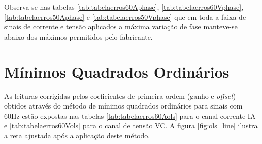 \begin{table}[H]
\end{table}

Observa-se nas tabelas \ref{tab:tabelaerros60Aphase}, \ref{tab:tabelaerros60Vphase}, \ref{tab:tabelaerros50Aphase} e \ref{tab:tabelaerros50Vphase} que em toda a faixa de sinais de corrente e tensão aplicados a máxima variação de fase manteve-se abaixo dos máximos permitidos pelo fabricante.

\newpage

\section{Mínimos Quadrados Ordinários}

As leituras corrigidas pelos coeficientes de primeira ordem (ganho e \textit{offset}) obtidos através do método de mínimos quadrados ordinários para sinais com 60Hz estão expostas nas tabelas \ref{tab:tabelaerros60Aols} para o canal corrente IA e \ref{tab:tabelaerros60Vols} para o canal de tensão VC. A figura \ref{fig:ols_line} ilustra a reta ajustada após a aplicação deste método.

